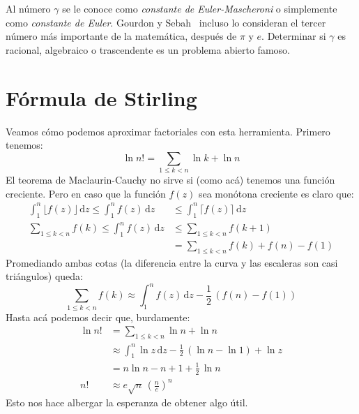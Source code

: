   Al número \(\gamma\)
  se le conoce como \emph{constante de Euler-Mascheroni}%
  o simplemente como \emph{constante de Euler}.
  Gourdon y Sebah~%
    \cite{gourdon03:_euler_const}
  incluso lo consideran
  el tercer número más importante de la matemática,
  después de \(\pi\) y \(e\).
  Determinar si \(\gamma\) es racional,%
  algebraico o trascendente
  es un problema abierto famoso.

\section{Fórmula de Stirling}
\label{sec:em-Stirling}

  Veamos cómo podemos aproximar factoriales
  con esta herramienta.
  Primero tenemos:
  \begin{equation*}
    \ln n!
      = \sum_{1 \le k < n} \ln k + \ln n
  \end{equation*}
  El teorema de Maclaurin-Cauchy no sirve si
  (como acá)
  tenemos una función creciente.
  Pero en caso que la función \(f(z)\) sea monótona creciente
  es claro que:
  \begin{align*}
    \int_1^n \lfloor f(z) \rfloor \, \mathrm{d} z
       \le \int _1^n f(z) \, \mathrm{d} z
      &\le \int_1^n \lceil f(z) \rceil \, \mathrm{d} z \\
    \sum_{1 \le k < n} f(k)
       \le \int _1^n f(z) \, \mathrm{d} z
      &\le \sum_{1 \le k < n} f(k + 1) \\
      &= \sum_{1 \le k < n} f(k) + f(n) - f(1)
  \end{align*}
  Promediando ambas cotas
  (la diferencia entre la curva y las escaleras son casi triángulos)
  queda:
  \begin{equation*}
    \sum_{1 \le k < n} f(k)
      \approx \int_1^n f(z) \, \mathrm{d} z
		- \frac{1}{2} \, (f(n) - f(1))
  \end{equation*}
  Hasta acá podemos decir que,
  burdamente:
  \begin{align*}
    \ln n!
      &= \sum_{1 \le k < n} \ln n + \ln n \\
      &\approx \int_1^n \ln z \, \mathrm{d} z
	  - \frac{1}{2} \, (\ln n - \ln 1)
	  + \ln z \\
      &= n \ln n - n + 1 + \frac{1}{2} \, \ln n \\
    n!
      &\approx e \sqrt{n} \, \left(\frac{n}{e}\right)^n
  \end{align*}
  Esto nos hace albergar la esperanza de obtener algo útil.

